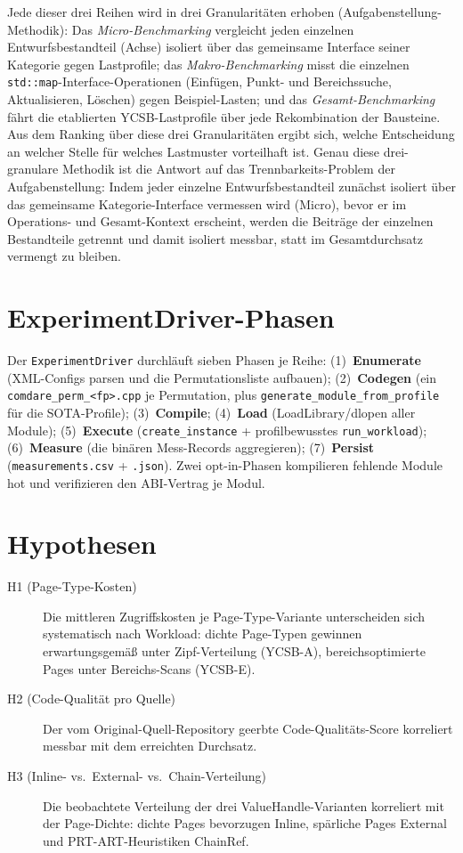 Jede dieser drei Reihen wird in drei Granularitäten erhoben (Aufgabenstellung-Methodik): Das
\emph{Micro-Benchmarking} vergleicht jeden einzelnen Entwurfsbestandteil (Achse) isoliert über das
gemeinsame Interface seiner Kategorie gegen Lastprofile; das \emph{Makro-Benchmarking} misst die
einzelnen \texttt{std::map}-Interface-Operationen (Einfügen, Punkt- und Bereichssuche,
Aktualisieren, Löschen) gegen Beispiel-Lasten; und das \emph{Gesamt-Benchmarking} fährt die
etablierten YCSB-Lastprofile über jede Rekombination der Bausteine. Aus dem Ranking über diese drei
Granularitäten ergibt sich, welche Entscheidung an welcher Stelle für welches Lastmuster vorteilhaft
ist. Genau diese drei-granulare Methodik ist die Antwort auf das Trennbarkeits-Problem der
Aufgabenstellung: Indem jeder einzelne Entwurfsbestandteil zunächst isoliert über das gemeinsame
Kategorie-Interface vermessen wird (Micro), bevor er im Operations- und Gesamt-Kontext erscheint,
werden die Beiträge der einzelnen Bestandteile getrennt und damit isoliert messbar, statt im
Gesamtdurchsatz vermengt zu bleiben.

\section{ExperimentDriver-Phasen}\label{sec:experimentdriver}

Der \texttt{ExperimentDriver} durchläuft sieben Phasen je Reihe: (1)~\textbf{Enumerate} (XML-Configs
parsen und die Permutationsliste aufbauen); (2)~\textbf{Codegen} (ein
\texttt{comdare\_perm\_<fp>.cpp} je Permutation, plus \texttt{generate\_module\_from\_profile} für
die SOTA-Profile); (3)~\textbf{Compile}; (4)~\textbf{Load} (LoadLibrary/dlopen aller Module);
(5)~\textbf{Execute} (\texttt{create\_instance} + profilbewusstes \texttt{run\_workload});
(6)~\textbf{Measure} (die binären Mess-Records aggregieren); (7)~\textbf{Persist}
(\texttt{measurements.csv} + \texttt{.json}). Zwei opt-in-Phasen kompilieren fehlende Module hot und
verifizieren den ABI-Vertrag je Modul.

\section{Hypothesen}\label{sec:hypotheses}

\begin{description}
  \item[H1 (Page-Type-Kosten)] Die mittleren Zugriffskosten je Page-Type-Variante unterscheiden sich
  systematisch nach Workload: dichte Page-Typen gewinnen erwartungsgemäß unter Zipf-Verteilung
  (YCSB-A), bereichsoptimierte Pages unter Bereichs-Scans (YCSB-E).
  \item[H2 (Code-Qualität pro Quelle)] Der vom Original-Quell-Repository geerbte
  Code-Qualitäts-Score korreliert messbar mit dem erreichten Durchsatz.
  \item[H3 (Inline- vs.\ External- vs.\ Chain-Verteilung)] Die beobachtete Verteilung der drei
  ValueHandle-Varianten korreliert mit der Page-Dichte: dichte Pages bevorzugen Inline, spärliche
  Pages External und PRT-ART-Heuristiken ChainRef.
\end{description}


